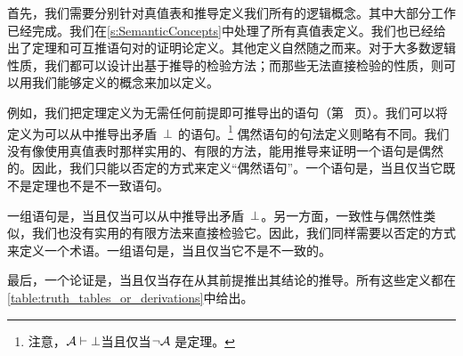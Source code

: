 首先，我们需要分别针对真值表和推导定义我们所有的逻辑概念。其中大部分工作已经完成。我们在\cref{s:SemanticConcepts}中处理了所有真值表定义。我们也已经给出了定理和可互推语句对的证明论定义。其他定义自然随之而来。对于大多数逻辑性质，我们都可以设计出基于推导的检验方法；而那些无法直接检验的性质，则可以用我们能够定义的概念来加以定义。

例如，我们把定理定义为无需任何前提即可推导出的语句（第~\pageref{def:syntactic_tautology_in_sl} 页）。我们可以将\label{def:syntactic_contradiction_in_sl}定义为可以从中推导出矛盾~$\bot$ 的语句。\footnote{注意，$\mathcal{A} \vdash \bot$当且仅当$\lnot \mathcal{A}$ 是定理。} 偶然语句的句法定义则略有不同。我们没有像使用真值表时那样实用的、有限的方法，能用推导来证明一个语句是偶然的。因此，我们只能以否定的方式来定义“偶然语句”。一个语句是\label{def:syntactically_contingent_in_sl}，当且仅当它既不是定理也不是不一致语句。

一组语句是\label{def:syntactically_inconsistent_ in_sl}，当且仅当可以从中推导出矛盾~$\bot$。另一方面，一致性与偶然性类似，我们也没有实用的有限方法来直接检验它。因此，我们同样需要以否定的方式来定义一个术语。一组语句是\label{def:syntactically consistent in SL}，当且仅当它不是不一致的。

最后，一个论证是\label{def:syntactically_valid_in_SL}，当且仅当存在从其前提推出其结论的推导。所有这些定义都在\cref{table:truth_tables_or_derivations}中给出。

\def\tmptable{\textbf{概念} 		&	\textbf{真值表（语义）定义} 	&	\textbf{证明论（句法）定义} \\ \hline \hline

重言式/定理   &	主逻辑算子下的真值列全为 T 的语句 & 可以不依赖任何前提而推导出的语句。	 \\ \hline

矛盾式/不一致语句		&	主逻辑算子下的真值列全为 F 的语句  &	可以从中推导出矛盾~$\ered$ 的语句\\ \hline

偶然语句	&	主逻辑算子下的真值列既包含 T 也包含 F 的语句 & 既不是定理也不是不一致语句的语句 \\ \hline

等价的/可互推的语句 &	主逻辑算子下的真值列完全相同。& 语句之间可以相互推导出来	\\ \hline

不可满足的/不一致的语句集	&	在真值表中没有一行能使它们全部为真的语句集。	& 可以从中推导出矛盾~$\ered$ 的语句集 \\ \hline

可满足的/一致的语句集	&	在真值表中至少有一行能使它们全部为真的语句集。 & 无法从中推导出矛盾~$\ered$ 的语句集	\\ \hline

有效论证		&	在其真值表中，没有这样一行：所有前提的主逻辑算子下均为 T，而结论的主逻辑算子下为 F。  & 可以从前提推导出结论的论证。}

